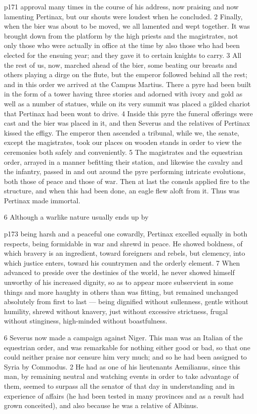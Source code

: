 p171 approval many times in the course of his address, now praising and now lamenting Pertinax, but our shouts were loudest when he concluded. 2 Finally, when the bier was about to be moved, we all lamented and wept together. It was brought down from the platform by the high priests and the magistrates, not only those who were actually in office at the time by also those who had been elected for the ensuing year; and they gave it to certain knights to carry. 3 All the rest of us, now, marched ahead of the bier, some beating our breasts and others playing a dirge on the flute, but the emperor followed behind all the rest; and in this order we arrived at the Campus Martius. There a pyre had been built in the form of a tower having three stories and adorned with ivory and gold as well as a number of statues, while on its very summit was placed a gilded chariot that Pertinax had been wont to drive. 4 Inside this pyre the funeral offerings were cast and the bier was placed in it, and then Severus and the relatives of Pertinax kissed the effigy. The emperor then ascended a tribunal, while we, the senate, except the magistrates, took our places on wooden stands in order to view the ceremonies both safely and conveniently. 5 The magistrates and the equestrian order, arrayed in a manner befitting their station, and likewise the cavalry and the infantry, passed in and out around the pyre performing intricate evolutions, both those of peace and those of war. Then at last the consuls applied fire to the structure, and when this had been done, an eagle flew aloft from it. Thus was Pertinax made immortal.

6
Although a warlike nature usually ends up by

p173 being harsh and a peaceful one cowardly, Pertinax excelled equally in both respects, being formidable in war and shrewd in peace. He showed boldness, of which bravery is an ingredient, toward foreigners and rebels, but clemency, into which justice enters, toward his countrymen and the orderly element. 7 When advanced to preside over the destinies of the world, he never showed himself unworthy of his increased dignity, so as to appear more subservient in some things and more haughty in others than was fitting, but remained unchanged absolutely from first to last \texthebrew{—} being dignified without sullenness, gentle without humility, shrewd without knavery, just without excessive strictness, frugal without stinginess, high-minded without boastfulness.

6
Severus now made a campaign against Niger. This man was an Italian of the equestrian order, and was remarkable for nothing either good or bad, so that one could neither praise nor censure him very much; and so he had been assigned to Syria by Commodus. 2 He had as one of his lieutenants Aemilianus, since this man, by remaining neutral and watching events in order to take advantage of them, seemed to surpass all the senator of that day in understanding and in experience of affairs (he had been tested in many provinces and as a result had grown conceited), and also because he was a relative of Albinus.

